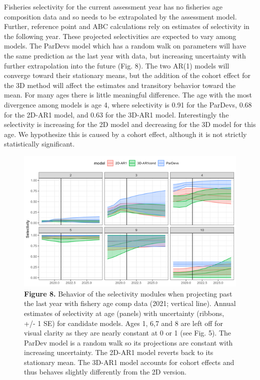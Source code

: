\documentclass[
]{article}
\begin{document}
Fisheries selectivity for the current assessment year has no fisheries
age composition data and so needs to be extrapolated by the assessment
model. Further, reference point and ABC calculations rely on estimates
of selectivity in the following year. These projected selectivities are
expected to vary among models. The ParDevs model which has a random walk
on parameters will have the same prediction as the last year with data,
but increasing uncertainty with further extrapolation into the future
(Fig. 8). The two AR(1) models will converge toward their stationary
means, but the addition of the cohort effect for the 3D method will
affect the estimates and transitory behavior toward the mean. For many
ages there is little meaningful difference. The age with the most
divergence among models is age 4, where selectivity is 0.91 for the
ParDevs, 0.68 for the 2D-AR1 model, and 0.63 for the 3D-AR1 model.
Interestingly the selectivity is increasing for the 2D model and
decreasing for the 3D model for this age. We hypothesize this is caused
by a cohort effect, although it is not strictly statistically
significant.

\begin{figure}
\hypertarget{fig:figure8}{%
\centering
\includegraphics{Results/Figure8_projected_sel.png}
\caption{\textbf{Figure 8.} Behavior of the selectivity modules when
projecting past the last year with fishery age comp data (2021; vertical
line). Annual estimates of selectivity at age (panels) with uncertainty
(ribbons, +/- 1 SE) for candidate models. Ages 1, 6,7 and 8 are left off
for visual clarity as they are nearly constant at 0 or 1 (see Fig. 5).
The ParDev model is a random walk so its projections are constant with
increasing uncertainty. The 2D-AR1 model reverts back to its stationary
mean. The 3D-AR1 model accounts for cohort effects and thus behaves
slightly differently from the 2D version.}\label{fig:figure8}
}
\end{figure}
\end{document}
